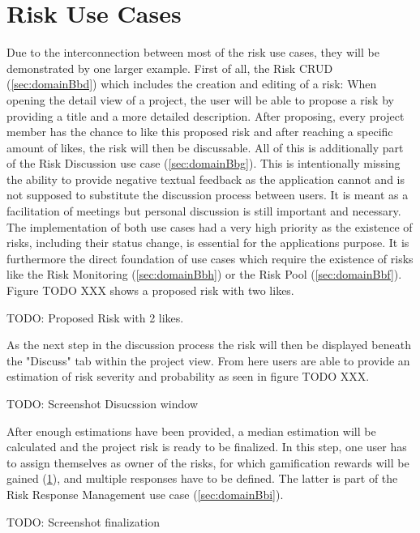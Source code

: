 
\section{Risk Use Cases}
\label{sec:implementationRisks}

Due to the interconnection between most of the risk use cases, they will be demonstrated by one larger example. First of all, the Risk CRUD (\ref{sec:domainBbd}) which includes the creation and editing of a risk: When opening the detail view of a project, the user will be able to propose a risk by providing a title and a more detailed description. After proposing, every project member has the chance to like this proposed risk and after reaching a specific amount of likes, the risk will then be discussable. All of this is additionally part of the Risk Discussion use case (\ref{sec:domainBbg}). This is intentionally missing the ability to provide negative textual feedback as the application cannot and is not supposed to substitute the discussion process between users. It is meant as a facilitation of meetings but personal discussion is still important and necessary. The implementation of both use cases had a very high priority as the existence of risks, including their status change, is essential for the applications purpose. It is furthermore the direct foundation of use cases which require the existence of risks like the Risk Monitoring (\ref{sec:domainBbh}) or the Risk Pool (\ref{sec:domainBbf}). Figure TODO XXX shows a proposed risk with two likes.

TODO: Proposed Risk with 2 likes.

As the next step in the discussion process the risk will then be displayed beneath the "Discuss" tab within the project view. From here users are able to provide an estimation of risk severity and probability as seen in figure TODO XXX.

TODO: Screenshot Disucssion window

After enough estimations have been provided, a median estimation will be calculated and the project risk is ready to be finalized. In this step, one user has to assign themselves as owner of the risks, for which gamification rewards will be gained (\ref{sec:implementationRisks}), and multiple responses have to be defined. The latter is part of the Risk Response Management use case (\ref{sec:domainBbi}).

TODO: Screenshot finalization


